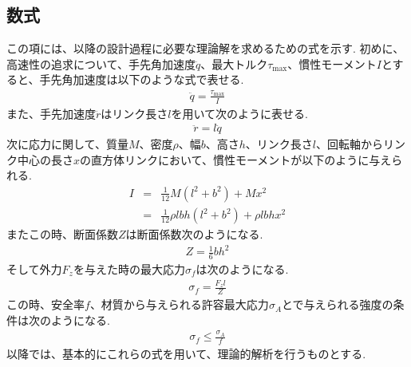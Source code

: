 \documentclass[10pt,b5paper,papersize,dvipdfmx]{jsbook}
\begin{document}
\subsection{数式}\label{数式}
この項には、以降の設計過程に必要な理論解を求めるための式を示す. 初めに、高速性の追求について、手先角加速度$\ddot{q}$、最大トルク$\tau_{\mathrm{max}}$、慣性モーメント$I$とすると、手先角加速度は以下のような式で表せる.
\begin{align}
\ddot{q}=\frac{\tau_{\mathrm{max}}}{I}
\end{align}
また、手先加速度$\ddot{r}$はリンク長さ$l$を用いて次のように表せる.
\begin{align}
\ddot{r}=l\ddot{q}
\end{align}
次に応力に関して、質量$M$、密度$\rho$、幅$b$、高さ$h$、リンク長さ$l$、回転軸からリンク中心の長さ$x$の直方体リンクにおいて、慣性モーメントが以下のように与えられる.
\begin{eqnarray}
  I&=&\frac{1}{12}M(l^2+b^2)+Mx^2\\
  &=&\frac{1}{12} \rho lbh(l^2+b^2 )+\rho lbhx^2
\end{eqnarray}
またこの時、断面係数$Z$は断面係数次のようになる.
\begin{align}
  Z=\frac{1}{6}bh^2
\end{align}
そして外力$F_z$を与えた時の最大応力$\sigma_f$は次のようになる.
\begin{align}
  \sigma_f=\frac{F_zl}{Z}
\end{align}
この時、安全率$f$、材質から与えられる許容最大応力$\sigma_A$とで与えられる強度の条件は次のようになる.
\begin{align}
  \sigma_f\leq\frac{\sigma_A}{f}
\end{align}
以降では、基本的にこれらの式を用いて、理論的解析を行うものとする.
\end{document}
